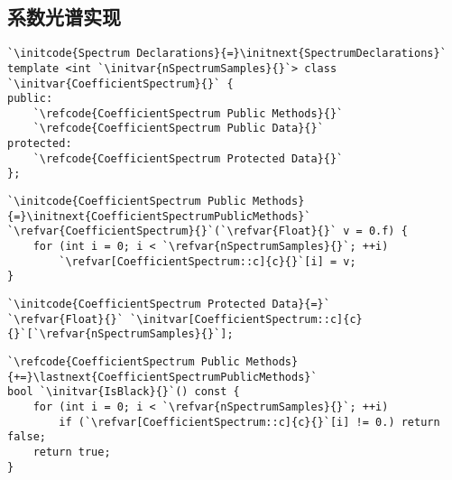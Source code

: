\subsection{系数光谱实现}\label{sub:系数光谱实现}
\begin{lstlisting}
`\initcode{Spectrum Declarations}{=}\initnext{SpectrumDeclarations}`
template <int `\initvar{nSpectrumSamples}{}`> class `\initvar{CoefficientSpectrum}{}` {
public:
    `\refcode{CoefficientSpectrum Public Methods}{}`
    `\refcode{CoefficientSpectrum Public Data}{}`
protected:
    `\refcode{CoefficientSpectrum Protected Data}{}`
};
\end{lstlisting}

\begin{lstlisting}
`\initcode{CoefficientSpectrum Public Methods}{=}\initnext{CoefficientSpectrumPublicMethods}`
`\refvar{CoefficientSpectrum}{}`(`\refvar{Float}{}` v = 0.f) {
    for (int i = 0; i < `\refvar{nSpectrumSamples}{}`; ++i)
        `\refvar[CoefficientSpectrum::c]{c}{}`[i] = v;
}
\end{lstlisting}

\begin{lstlisting}
`\initcode{CoefficientSpectrum Protected Data}{=}`
`\refvar{Float}{}` `\initvar[CoefficientSpectrum::c]{c}{}`[`\refvar{nSpectrumSamples}{}`];
\end{lstlisting}

\begin{lstlisting}
`\refcode{CoefficientSpectrum Public Methods}{+=}\lastnext{CoefficientSpectrumPublicMethods}`
bool `\initvar{IsBlack}{}`() const {
    for (int i = 0; i < `\refvar{nSpectrumSamples}{}`; ++i)
        if (`\refvar[CoefficientSpectrum::c]{c}{}`[i] != 0.) return false;
    return true;
}
\end{lstlisting}